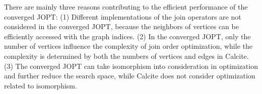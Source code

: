 There are mainly three reasons contributing to the efficient performance of the converged JOPT:
(1) Different implementations of the join operators are not considered in the converged JOPT, because the neighbors of vertices can be efficiently accessed with the graph indices.
(2) In the converged JOPT, only the number of vertices influence the complexity of join order optimization, while the complexity is determined by both the numbers of vertices and edges in Calcite.
(3) The converged JOPT can take isomorphism into consideration in optimization and further reduce the search space, while Calcite does not consider optimization related to isomorphism.
